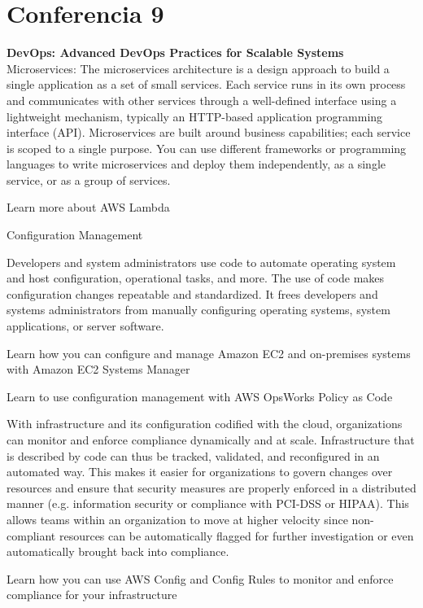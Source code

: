 \documentclass[12pt]{book}
\begin{document}
\chapter{Conferencia 9}
\normalfont\LARGE \textbf{DevOps: Advanced DevOps Practices for Scalable Systems}
\normalfont\small\\

Microservices:
The microservices architecture is a design approach to build a single application as a set of small services. Each service runs in its own process and communicates with other services through a well-defined interface using a lightweight mechanism, typically an HTTP-based application programming interface (API). Microservices are built around business capabilities; each service is scoped to a single purpose. You can use different frameworks or programming languages to write microservices and deploy them independently, as a single service, or as a group of services.

Learn more about AWS Lambda

Configuration Management

Developers and system administrators use code to automate operating system and host configuration, operational tasks, and more. The use of code makes configuration changes repeatable and standardized. It frees developers and systems administrators from manually configuring operating systems, system applications, or server software.

Learn how you can configure and manage Amazon EC2 and on-premises systems with Amazon EC2 Systems Manager

Learn to use configuration management with AWS OpsWorks
Policy as Code

With infrastructure and its configuration codified with the cloud, organizations can monitor and enforce compliance dynamically and at scale. Infrastructure that is described by code can thus be tracked, validated, and reconfigured in an automated way. This makes it easier for organizations to govern changes over resources and ensure that security measures are properly enforced in a distributed manner (e.g. information security or compliance with PCI-DSS or HIPAA). This allows teams within an organization to move at higher velocity since non-compliant resources can be automatically flagged for further investigation or even automatically brought back into compliance.

Learn how you can use AWS Config and Config Rules to monitor and enforce compliance for your infrastructure
\end{document}
